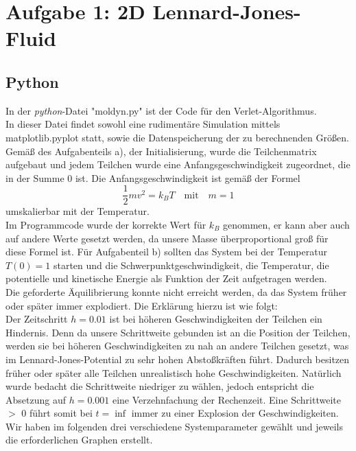 \newpage
\section{Aufgabe 1: 2D Lennard-Jones-Fluid}
\label{sec:auf1}

\subsection{Python}

In der \textit{python}-Datei "moldyn.py" ist der Code für den Verlet-Algorithmus.\\
In dieser Datei findet sowohl eine rudimentäre Simulation mittels matplotlib.pyplot statt, sowie die Datenspeicherung der zu berechnenden Größen.
\newline\\
Gemäß des Aufgabenteils a), der Initialisierung, wurde die Teilchenmatrix aufgebaut und jedem Teilchen wurde eine Anfangsgeschwindigkeit zugeordnet, die in der Summe 0 ist.
Die Anfangsgeschwindigkeit ist gemäß der Formel
\begin{equation}
    \frac{1}{2}mv^2 = k_BT \quad \text{mit} \quad m = 1
\end{equation}
umskalierbar mit der Temperatur.\\
Im Programmcode wurde der korrekte Wert für $k_B$ genommen, er kann aber auch auf andere Werte gesetzt werden, da unsere Masse überproportional groß für diese Formel ist.
\newpage
Für Aufgabenteil b) sollten das System bei der Temperatur $T(0) = 1$ starten und die Schwerpunktgeschwindigkeit, die Temperatur, die potentielle und kinetische Energie als Funktion der Zeit aufgetragen werden.\\
Die geforderte Äquilibrierung konnte nicht erreicht werden, da das System früher oder später immer explodiert.
Die Erklärung hierzu ist wie folgt:\\
Der Zeitschritt $h=0.01$ ist bei höheren Geschwindigkeiten der Teilchen ein Hindernis.
Denn da unsere Schrittweite gebunden ist an die Position der Teilchen, werden sie bei höheren Geschwindigkeiten zu nah an andere Teilchen gesetzt, was im Lennard-Jones-Potential zu sehr hohen Abstoßkräften führt.
Dadurch besitzen früher oder später alle Teilchen unrealistisch hohe Geschwindigkeiten.
Natürlich wurde bedacht die Schrittweite niedriger zu wählen, jedoch entspricht die Absetzung auf $h=0.001$ eine Verzehnfachung der Rechenzeit.
Eine Schrittweite $>$ 0 führt somit bei $t=\inf$ immer zu einer Explosion der Geschwindigkeiten.\\
\newline
Wir haben im folgenden drei verschiedene Systemparameter gewählt und jeweils die erforderlichen Graphen erstellt.
